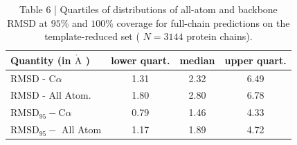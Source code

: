 \documentclass[10pt]{article}
\def\AA{\mathring{\mathrm{A}}}
\begin{document}
\begin{table}[h]
\begin{center}
\captionsetup{labelformat=empty}
\caption{Table 6 | Quartiles of distributions of all-atom and backbone RMSD at $95 \%$ and $100 \%$ coverage for full-chain predictions on the template-reduced set ( $N=3144$ protein chains).}
\begin{tabular}{lccc}
\hline
Quantity (in $\AA$ ) & lower quart. & median & upper quart. \\
\hline
RMSD - $\mathrm{C} \alpha$ & 1.31 & 2.32 & 6.49 \\
RMSD - All Atom. & 1.80 & 2.80 & 6.78 \\
$\mathrm{RMSD}_{95}-\mathrm{C} \alpha$ & 0.79 & 1.46 & 4.33 \\
$\mathrm{RMSD}_{95}-$ All Atom & 1.17 & 1.89 & 4.72 \\
\hline
\end{tabular}
\end{center}
\end{table}
\end{document}
